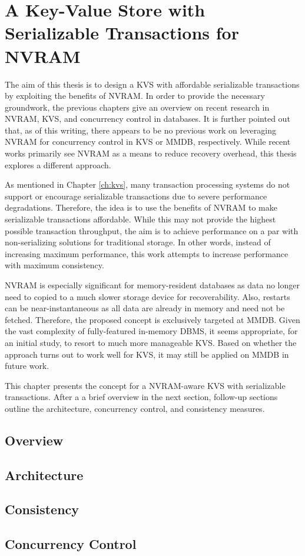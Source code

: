 \chapter{A Key-Value Store with Serializable Transactions for NVRAM}
\label{ch:concept}

The aim of this thesis is to design a KVS with affordable serializable
transactions by exploiting the benefits of NVRAM. In order to provide the
necessary groundwork, the previous chapters give an overview on recent research
in NVRAM, KVS, and concurrency control in databases. It is further pointed out
that, as of this writing, there appears to be no previous work on leveraging
NVRAM for concurrency control in KVS or MMDB, respectively. While recent works
primarily see NVRAM as a means to reduce recovery overhead, this thesis explores
a different approach.

As mentioned in Chapter \ref{ch:kvs}, many transaction processing systems do not
support or encourage serializable transactions due to severe performance
degradations. Therefore, the idea is to use the benefits of NVRAM to make
serializable transactions affordable. While this may not provide the highest
possible transaction throughput, the aim is to achieve performance on a par with
non-serializing solutions for traditional storage. In other words, instead of
increasing maximum performance, this work attempts to increase performance with
maximum consistency.

NVRAM is especially significant for memory-resident databases as data no longer
need to copied to a much slower storage device for recoverability. Also,
restarts can be near-instantaneous as all data are already in memory and need
not be fetched. Therefore, the proposed concept is exclusively targeted at MMDB.
Given the vast complexity of fully-featured in-memory DBMS, it seems
appropriate, for an initial study, to resort to much more manageable KVS. Based
on whether the approach turns out to work well for KVS, it may still be applied
on MMDB in future work.

This chapter presents the concept for a NVRAM-aware KVS with serializable transactions. After a a brief overview in the next section, follow-up sections outline the architecture, concurrency control, and consistency measures.

\section{Overview}
\label{sec:concept-overview}

\section{Architecture}
\label{sec:concept-arch}

\section{Consistency}
\label{sec:concept-concistency}

\section{Concurrency Control}
\label{sec:concept-cc}
